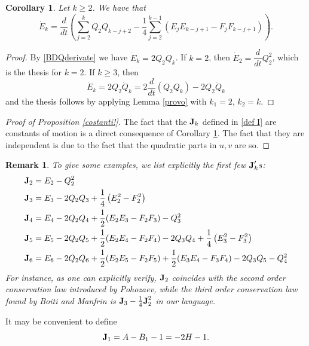 \documentclass[reqno,11pt]{amsart}
\theoremstyle{plain}
\numberwithin{equation}{section}
\newtheorem{corollary}[theorem]{Corollary}
\newtheorem{remark}[theorem]{Remark}
\newcommand{\I}{{\texttt{\bf J}}}
\newcommand{\ddt}{\dfrac{d}{dt}}
\begin{document}
{\begin{corollary}\label{lemma1}
	Let $k\geq2$. We have that
	\begin{equation}
		\dot E_k =	 \ddt\left( \sum_{j=2}^k Q_2 Q_{k-j+2} - \frac14 \sum_{j=2}^{k-1}(E_j E_{k-j+1} - F_j F_{k-j+1}) \right).
	\end{equation}
\end{corollary}
\begin{proof}
	By \eqref{BDQderivate} we have $\dot E_k = 2Q_2 \dot Q_k$. If $k=2$, then $\dot E_2 = \ddt Q_2^2$, which is the thesis for $k=2$. If $k\geq3$, then
	\[
	\dot E_k = 2Q_2 \dot Q_k = 2\ddt(Q_2 Q_k)- 2 Q_2 \dot Q_k
	\]
	and the thesis follows by applying Lemma \ref{provo} with $k_1=2$, $k_2=k$.
\end{proof}
\begin{proof}[Proof of Proposition \ref{costanti!}]
	The fact that the $\I_k$ defined in \eqref{def I} are constants of motion is a direct consequence of Corollary \ref{lemma1}. The fact that they are independent  is due to the fact that the quadratic parts in $u,v$ are so.
\end{proof}


\begin{remark}
	To give some examples, we list explicitly the first few $\I_k's$:
	\begin{align*}
		\I_2 &= E_2 - Q_2^2 \\
		\I_3 &= E_3 - 2Q_2 Q_3 + \frac{1}{4}\left(E_2^2 - F_2^2\right) \\
		\I_4 &= E_4 - 2Q_2 Q_4 + \frac{1}{2}(E_2 E_3 - F_2 F_3) - Q_3^2 \\
		\I_5 &= E_5 - 2Q_2 Q_5 + \frac{1}{2}(E_2 E_4 - F_2 F_4) - 2Q_3 Q_4 + \frac{1}{4}\left(E_3^2 - F_3^2\right) \\
		\I_6 &= E_6 - 2Q_2 Q_6 + \frac{1}{2}(E_2 E_5 - F_2 F_5) + \frac{1}{2}(E_3 E_4 - F_3 F_4) - 2Q_3 Q_5 - Q_4^2
	\end{align*}
	For instance, as one can explicitly verify, $\I_2$ coincides with the second order conservation law introduced by Pohozaev, while the third order conservation law found by Boiti and Manfrin is $\I_3-\frac14\I_2^2$ in our language.
\end{remark}
It may be convenient to define 
\begin{equation}\label{def:J1}
	\I_{1} = A - B_{1} - 1 = -2H -1.
\end{equation}


}
\end{document}
